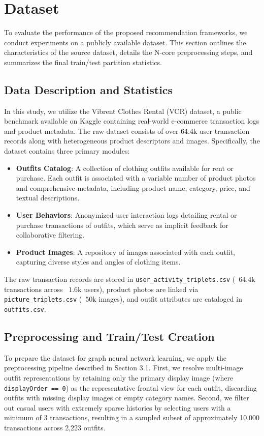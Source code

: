 \section{Dataset}

To evaluate the performance of the proposed recommendation frameworks, we conduct experiments on a publicly available dataset. This section outlines the characteristics of the source dataset, details the N-core preprocessing steps, and summarizes the final train/test partition statistics.

\subsection{Data Description and Statistics}

In this study, we utilize the Vibrent Clothes Rental (VCR) dataset, a public benchmark available on Kaggle containing real-world e-commerce transaction logs and product metadata. The raw dataset consists of over $64.4\text{k}$ user transaction records along with heterogeneous product descriptors and images. Specifically, the dataset contains three primary modules:
\begin{itemize}
    \item \textbf{Outfits Catalog}: A collection of clothing outfits available for rent or purchase. Each outfit is associated with a variable number of product photos and comprehensive metadata, including product name, category, price, and textual descriptions.
    \item \textbf{User Behaviors}: Anonymized user interaction logs detailing rental or purchase transactions of outfits, which serve as implicit feedback for collaborative filtering.
    \item \textbf{Product Images}: A repository of images associated with each outfit, capturing diverse styles and angles of clothing items.
\end{itemize}
The raw transaction records are stored in \texttt{user\_activity\_triplets.csv} (~$64.4\text{k}$ transactions across ~$1.6\text{k}$ users), product photos are linked via \texttt{picture\_triplets.csv} (~$50\text{k}$ images), and outfit attributes are cataloged in \texttt{outfits.csv}.

\subsection{Preprocessing and Train/Test Creation}

To prepare the dataset for graph neural network learning, we apply the preprocessing pipeline described in Section 3.1. First, we resolve multi-image outfit representations by retaining only the primary display image (where \texttt{displayOrder == 0}) as the representative frontal view for each outfit, discarding outfits with missing display images or empty category names. Second, we filter out casual users with extremely sparse histories by selecting users with a minimum of 3 transactions, resulting in a sampled subset of approximately 10,000 transactions across 2,223 outfits.


